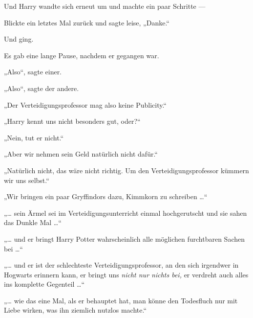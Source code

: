 Und Harry wandte sich erneut um und machte ein paar Schritte —

Blickte ein letztes Mal zurück und sagte leise,
„Danke.“

Und ging.

Es gab eine lange Pause, nachdem er gegangen war.

„Also“, sagte einer.

„Also“, sagte der andere.

„Der Verteidigungsprofessor mag also keine Publicity.“

„Harry kennt uns nicht besonders gut, oder?“

„Nein, tut er nicht.“

„Aber wir nehmen sein Geld natürlich nicht dafür.“

„Natürlich nicht, das wäre nicht richtig. Um den Verteidigungsprofessor kümmern wir uns selbst.“

„Wir bringen ein paar Gryffindors dazu, Kimmkorn zu schreiben …“

„… sein Ärmel sei im Verteidigungsunterricht einmal hochgerutscht und sie sahen das Dunkle Mal …“

„… und er bringt Harry Potter wahrscheinlich alle möglichen furchtbaren Sachen bei …“

„… und er ist der schlechteste Verteidigungsprofessor, an den sich irgendwer in Hogwarts erinnern kann, er bringt uns \emph{nicht nur nichts bei,} er verdreht auch alles ins komplette Gegenteil …“

„… wie das eine Mal, als er behauptet hat, man könne den Todesfluch nur mit Liebe wirken, was ihn ziemlich nutzlos machte.“

